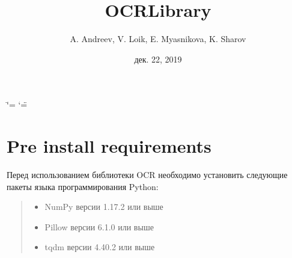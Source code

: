 \documentclass[letterpaper,10pt,russian]{sphinxmanual}
\title{OCRLibrary}
\date{дек. 22, 2019}
\author{A.\@{} Andreev, V.\@{} Loik, E.\@{} Myasnikova, K.\@{} Sharov}
\begin{document}
\ifdefined\shorthandoff
  \ifnum\catcode`\=\string=\active\shorthandoff{=}\fi
  \ifnum\catcode`\"=\active{}\fi
\fi

\pagestyle{empty}
\sphinxmaketitle
\pagestyle{plain}
\sphinxtableofcontents
\pagestyle{normal}
\label{\detokenize{index::doc}}



\chapter{Pre install requirements}
\label{\detokenize{Installation:pre-install-requirements}}\label{\detokenize{Installation::doc}}
Перед использованием библиотеки OCR необходимо установить следующие пакеты языка программирования Python:
\begin{quote}
\begin{itemize}
\item {} 
NumPy версии 1.17.2 или выше

\end{itemize}

\begin{sphinxVerbatim}[commandchars=\\\{\}]
  
\end{sphinxVerbatim}
\begin{itemize}
\item {} 
Pillow версии 6.1.0 или выше

\end{itemize}

\begin{sphinxVerbatim}[commandchars=\\\{\}]
  
\end{sphinxVerbatim}
\begin{itemize}
\item {} 
tqdm версии 4.40.2 или выше

\end{itemize}

\begin{sphinxVerbatim}[commandchars=\\\{\}]
  
\end{sphinxVerbatim}
\end{quote}
\end{document}
